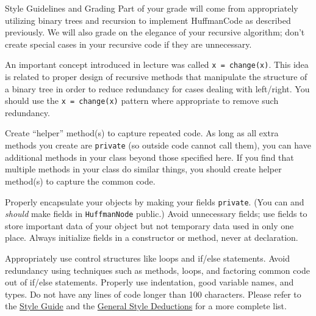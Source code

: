\documentclass[programming]{../../mfcs}
\begin{document}
\begin{question}{Style Guidelines and Grading}
Part of your grade will come from appropriately utilizing binary trees and recursion to
implement HuffmanCode as described previously.  We will also grade on the elegance of your
recursive algorithm; don't create special cases in your recursive code if they are
unnecessary.

\vspace{0.5em}

An important concept introduced in lecture was called \texttt{x = change(x)}. This idea is
related to proper design of recursive methods that manipulate the structure of a binary
tree in order to reduce redundancy for cases dealing with left/right. You should use the
\texttt{x = change(x)} pattern where appropriate to remove such redundancy.

Create ``helper'' method(s) to capture repeated code.  As long as all extra methods you
create are \texttt{private} (so outside code cannot call them), you can  have additional
methods in your class beyond those specified here.  If you find that multiple methods in
your class do similar things, you should create helper method(s) to capture the common code.

Properly encapsulate your objects by making your fields \texttt{private}. (You can and
\emph{should} make fields in \texttt{HuffmanNode} public.) Avoid unnecessary fields;
use fields to store important data of your object but not temporary data used in only one
place. Always initialize fields in a constructor or method, never at declaration.

Appropriately use control structures like loops and if/else statements.  Avoid redundancy
using techniques such as methods, loops, and factoring common code out of if/else
statements. Properly use indentation, good variable names, and types. Do not have any lines
of code longer than 100 characters. Please refer to the \href{https://courses.cs.washington.edu/courses/cse143/19wi/homework/cse143-style-guide2/javaguide.html}{Style Guide}
and the \href{https://courses.cs.washington.edu/courses/cse143/19wi/style.shtml}{General Style Deductions} for a more complete list.

\end{question}
\end{document}
